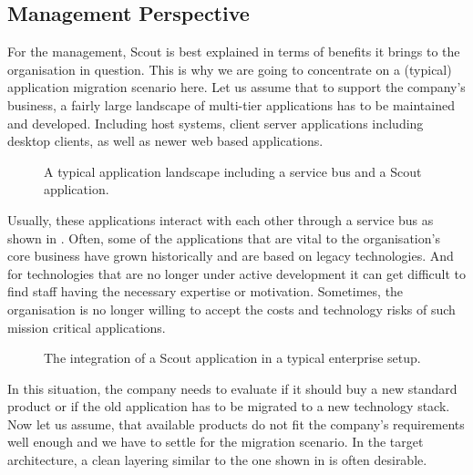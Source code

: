 \documentclass[a4paper,10pt,twoside]{book}
\begin{document}
\subsection{Management Perspective}

For the management, Scout is best explained in terms of benefits it brings to the organisation in question. 
This is why we are going to concentrate on a (typical) application migration scenario here. 
Let us assume that to support the company's business, a fairly large landscape of multi-tier applications has to be maintained and developed. 
Including host systems, client server applications including desktop clients, as well as newer web based applications. 

\begin{figure}
\caption{A typical application landscape including a service bus and a Scout application.}
\end{figure}

Usually, these applications interact with each other through a service bus as shown in . 
Often, some of the applications that are vital to the organisation's core business have grown historically and are based on legacy technologies. 
And for technologies that are no longer under active development it can get difficult to find staff having the necessary expertise or motivation. 
Sometimes, the organisation is no longer willing to accept the costs and technology risks of such mission critical applications. 

\begin{figure}
\caption{The integration of a Scout application in a typical enterprise setup.}
\end{figure}

In this situation, the company needs to evaluate if it should buy a new standard product or if the old application has to be migrated to a new technology stack. 
Now let us assume, that available products do not fit the company's requirements well enough and we have to settle for the migration scenario.
In the target architecture, a clean layering similar to the one shown in  is often desirable.
\end{document}
